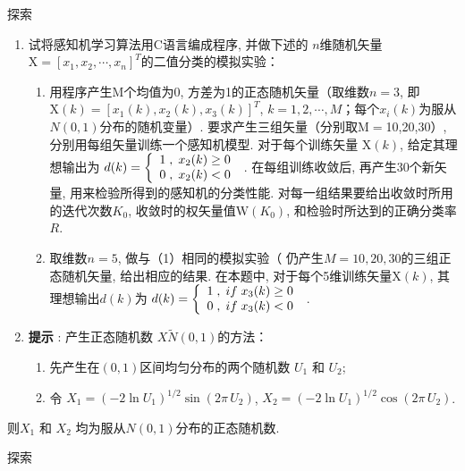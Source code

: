 {%
\begin{custom}[explorecolor]{探索}
\begin{enumerate}
\item 试将感知机学习算法用C语言编成程序, 并做下述的 $n$维随机矢量$\mbox{X}=[x_{1} ,x_{2} ,\cdots ,x_{n} ]^{T}$的二值分类的模拟实验：
	\begin{enumerate}
	\item 用程序产生M个均值为0, 方差为1的正态随机矢量（取维数$n=3$, 即 $\mbox{X}(k)=[x_{1} (k),x_{2} (k),x_{3} (k)]^{T}$, $k=1,2,\cdots ,M$；每个$x_{i} (k)$为服从$N(0,1)$分布的随机变量）. 要求产生三组矢量（分别取M$=$10,20,30）, 分别用每组矢量训练一个感知机模型. 对于每个训练矢量 $\mbox{X}(k)$, 给定其理想输出为 $d(k)=\left\{ {{\begin{array}{*{20}c}
 {1\;,\;x_{2} (k)\ge 0} \hfill \\
 {0\;,\;x_{2} (k)<0} \hfill \\
\end{array} }} \right.$ . 在每组训练收敛后, 再产生30个新矢量, 用来检验所得到的感知机的分类性能. 对每一组结果要给出收敛时所用的迭代次数$K_{0}$, 收敛时的权矢量值$\mbox{W}(K_{0})$, 和检验时所达到的正确分类率$R$.
	\item 取维数$n=5$, 做与（1）相同的模拟实验（ 仍产生$M=10,20,30$的三组正态随机矢量, 给出相应的结果. 在本题中, 对于每个5维训练矢量$\mbox{X}(k)$, 其理想输出$d(k)$为 $d(k)=\left\{{{\begin{array}{*{20}c}
 {1\;,\;if\;x_{3} (k)\ge 0} \hfill \\
 {0\;,\;if\;x_{3} (k)<0} \hfill \\
\end{array} }} \right.$ .
	\end{enumerate}
\item[\textbullet] \textbf{提示 }: 产生正态随机数 $X\tilde N(0,1)$的方法：
	\begin{enumerate}
	\item 先产生在$(0, 1)$区间均匀分布的两个随机数 $U_{1}$ 和 $U_{2}$;
	\item 令 $X_{1} =(-2\ln U_{1} )^{1/2}\sin (2\pi \,U_{2} )$, $X_{2} =(-2\ln U_{1} )^{1/2}\cos (2\pi \,U_{2} )$.
	\end{enumerate}
\end{enumerate}
则$X_{1} $ 和 $X_{2} $ 均为服从$ N(0,1)$分布的正态随机数.
\end{custom}
\begin{custom}[explorecolor]{探索}

\end{custom}}
